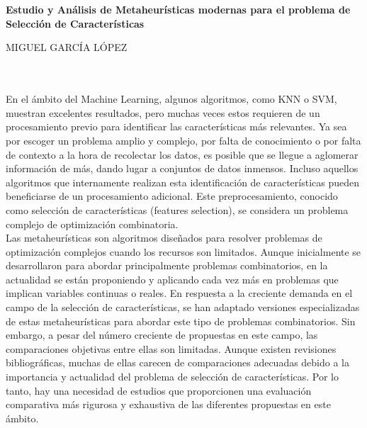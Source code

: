 \chapter*{}






\cleardoublepage
\thispagestyle{empty}

\begin{center}
{\large\bfseries Estudio y Análisis de Metaheurísticas modernas para el problema de Selección de Características}\\
\end{center}
\begin{center}
MIGUEL GARCÍA LÓPEZ\\
\end{center}

\\

\vspace{0.7cm}
\\

En el ámbito del Machine Learning, algunos algoritmos, como KNN o SVM, muestran excelentes resultados, pero muchas veces estos requieren de un procesamiento previo para identificar las características más relevantes. Ya sea por escoger un problema amplio y complejo, por falta de conocimiento o por falta de contexto a la hora de recolectar los datos, es posible que se llegue a aglomerar información de más, dando lugar a conjuntos de datos inmensos. Incluso aquellos algoritmos que internamente realizan esta identificación de características pueden beneficiarse de un procesamiento adicional. Este preprocesamiento, conocido como selección de características (features selection), se considera un problema complejo de optimización combinatoria.\\[6pt]

Las metaheurísticas son algoritmos diseñados para resolver problemas de optimización complejos cuando los recursos son limitados. Aunque inicialmente se desarrollaron para abordar principalmente problemas combinatorios, en la actualidad se están proponiendo y aplicando cada vez más en problemas que implican variables continuas o reales. En respuesta a la creciente demanda en el campo de la selección de características, se han adaptado versiones especializadas de estas metaheurísticas para abordar este tipo de problemas combinatorios. Sin embargo, a pesar del número creciente de propuestas en este campo, las comparaciones objetivas entre ellas son limitadas. Aunque existen revisiones bibliográficas, muchas de ellas carecen de comparaciones adecuadas debido a la importancia y actualidad del problema de selección de características. Por lo tanto, hay una necesidad de estudios que proporcionen una evaluación comparativa más rigurosa y exhaustiva de las diferentes propuestas en este ámbito.\\[6pt]

